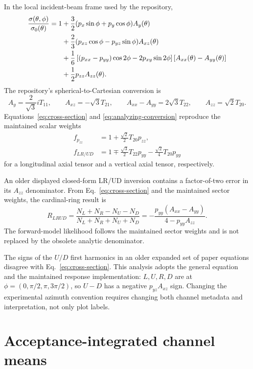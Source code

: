 \documentclass[11pt,a4paper]{article}
\begin{document}
In the local incident-beam frame used by the repository,
\begin{align}
 \frac{\sigma(\theta,\phi)}{\sigma_0(\theta)}=1
 &+\frac32(p_x\sin\phi+p_y\cos\phi)A_y(\theta)\notag\\
 &+\frac23(p_{xz}\cos\phi-p_{yz}\sin\phi)A_{xz}(\theta)\notag\\
 &+\frac16\left[(p_{xx}-p_{yy})\cos2\phi
 -2p_{xy}\sin2\phi\right]
 [A_{xx}(\theta)-A_{yy}(\theta)]\notag\\
 &+\frac12p_{zz}A_{zz}(\theta).
 \label{eq:cross-section}
\end{align}
The repository's spherical-to-Cartesian conversion is
\begin{equation}
 A_y=\frac{2}{\sqrt3}iT_{11},\qquad
 A_{xz}=-\sqrt3T_{21},\qquad
 A_{xx}-A_{yy}=2\sqrt3T_{22},\qquad
 A_{zz}=\sqrt2T_{20}.
 \label{eq:analyzing-conversion}
\end{equation}
Equations~\eqref{eq:cross-section} and \eqref{eq:analyzing-conversion}
reproduce the maintained scalar weights
\begin{align}
 f_{p_{zz}}&=1+\frac{\sqrt2}{2}T_{20}p_{zz},\\
 f_{LR/UD}&=1\mp\frac{\sqrt3}{2}T_{22}p_{yy}
 -\frac{\sqrt2}{4}T_{20}p_{yy}
\end{align}
for a longitudinal axial tensor and a vertical axial tensor, respectively.

An older displayed closed-form LR/UD inversion contains a factor-of-two error
in its $A_{zz}$ denominator.  From Eq.~\eqref{eq:cross-section} and the
maintained sector weights, the cardinal-ring result is
\begin{equation}
 R_{LRUD}=
 \frac{N_L+N_R-N_U-N_D}{N_L+N_R+N_U+N_D}
 =-\frac{p_{yy}(A_{xx}-A_{yy})}{4-p_{yy}A_{zz}}.
 \label{eq:lrud-corrected}
\end{equation}
The forward-model likelihood follows the maintained sector weights and is not
replaced by the obsolete analytic denominator.

The signs of the $U/D$ first harmonics in an older expanded set of paper
equations disagree with Eq.~\eqref{eq:cross-section}.  This analysis adopts the
general equation and the maintained response implementation: $L,U,R,D$ are at
$\phi=(0,\pi/2,\pi,3\pi/2)$, so $U-D$ has a negative $p_{yz}A_{xz}$ sign.
Changing the experimental azimuth convention requires changing both channel
metadata and interpretation, not only plot labels.

\section{Acceptance-integrated channel means}
\end{document}
